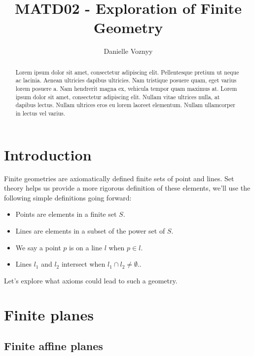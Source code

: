 \documentclass[12pt]{article}
\title{MATD02 - Exploration of Finite Geometry }
\author{Danielle Voznyy}
\date{}
\begin{document}
    \maketitle

    \begin{abstract}
        Lorem ipsum dolor sit amet, consectetur adipiscing elit.
        Pellentesque pretium ut neque ac lacinia.
        Aenean ultricies dapibus ultricies.
        Nam tristique posuere quam, eget varius lorem posuere a.
        Nam hendrerit magna ex, vehicula tempor quam maximus at.
        Lorem ipsum dolor sit amet, consectetur adipiscing elit.
        Nullam vitae ultrices nulla, at dapibus lectus.
        Nullam ultrices eros eu lorem laoreet elementum.
        Nullam ullamcorper in lectus vel varius.
    \end{abstract}

    \section{Introduction}

    Finite geometries are axiomatically defined finite sets of point and lines.
    Set theory helps us provide a more rigorous definition of these elements,
    we'll use the following simple definitions going forward:

    \begin{itemize}
        \setlength\itemsep{0em}
        \item Points are elements in a finite set \( S \).
        \item Lines are elements in a subset of the power set of \( S \).
        \item We say a point \( p \) is on a line \( l \) when \( p \in l \).
        \item Lines \( l_1 \) and \( l_2 \) intersect when \( l_1 \cap l_2 \neq \emptyset \)..
    \end{itemize}

    Let's explore what axioms could lead to such a geometry.

    \section{Finite planes}

    \subsection{Finite affine planes}
\end{document}
